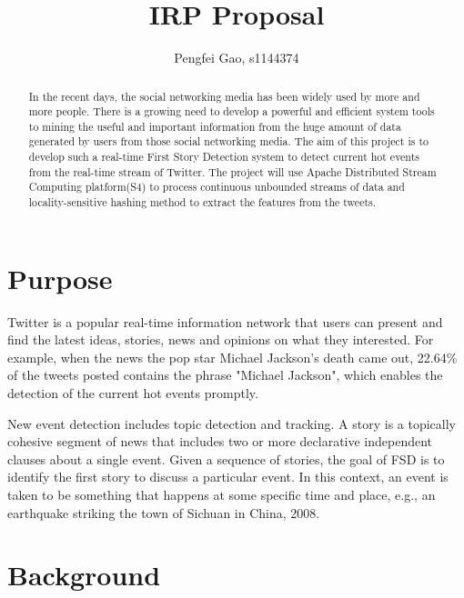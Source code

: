 \documentclass[a4paper,12pt]{article}
\title{IRP Proposal}
\author{Pengfei Gao, s1144374}
\begin{document}
\maketitle

\begin{abstract}

In the recent days, the social networking media has been widely used by more and more people. There is a growing need to develop a powerful and efficient system tools to mining the useful and important information from the huge amount of data generated by users from those social networking media. The aim of this project is to develop such a real-time First Story Detection system to detect current hot events from the real-time stream of Twitter. The project will use Apache Distributed Stream Computing platform(S4) to process continuous unbounded streams of data and locality-sensitive hashing method to extract the features from the tweets.

\end{abstract}



\section{Purpose}


Twitter is a popular real-time information network that users can present and find the latest ideas, stories, news and opinions on what they interested. For example, when the news the pop star Michael Jackson's death came out, 22.64\% of the tweets posted contains the phrase "Michael Jackson", which enables the detection of the current hot events promptly.\newline



New event detection includes topic detection and tracking. A story is a topically cohesive segment of news that includes two or more declarative independent clauses about a single event. Given a sequence of stories, the goal of FSD is to identify the first story to discuss a particular event. In this context, an event is taken to be something that happens at some specific time and place, e.g., an earthquake striking the town of Sichuan in China, 2008.











\section{Background}
\end{document}
